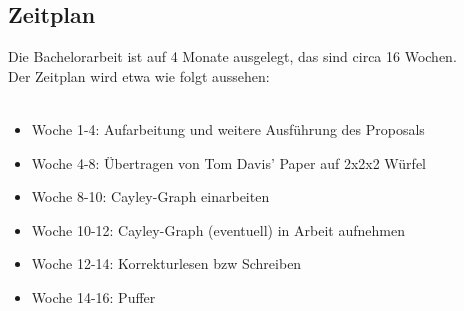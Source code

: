 \documentclass[12pt,a4paper, usenames, dvipsnames]{article}
\begin{document}
\newpage














\subsection*{Zeitplan}

Die Bachelorarbeit ist auf 4 Monate ausgelegt, das sind circa 16 Wochen. \\
Der Zeitplan wird etwa wie folgt aussehen: \\
\\
\begin{itemize}
\item Woche 1-4: Aufarbeitung und weitere Ausführung des Proposals
\item Woche 4-8: Übertragen von Tom Davis' Paper auf 2x2x2 Würfel
\item Woche 8-10: Cayley-Graph einarbeiten
\item Woche 10-12: Cayley-Graph (eventuell) in Arbeit aufnehmen
\item Woche 12-14: Korrekturlesen bzw Schreiben
\item Woche 14-16: Puffer
\end{itemize}


\newpage






\end{document}
